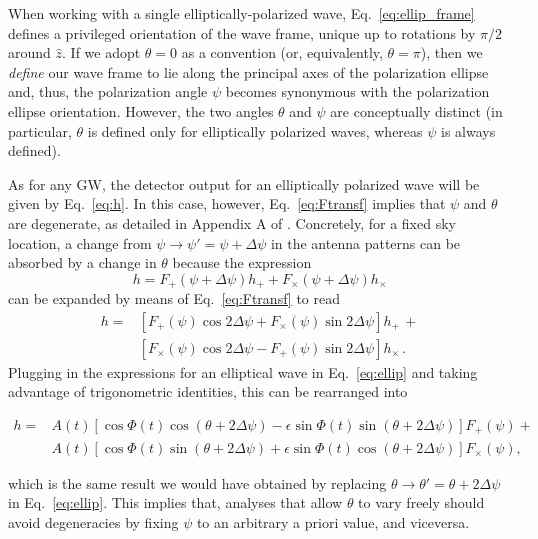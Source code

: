 \documentclass[aps,prd,twocolumn,superscriptaddress,preprintnumbers,floatfix,nofootinbib]{revtex4-2}
\newcommand{\beq}{\begin{equation}}
\newcommand{\eeq}{\end{equation}}
\newcommand*{\eq}[1]{Eq.~\eqref{eq:#1}}
\begin{document}
When working with a single elliptically-polarized wave, Eq.~\eqref{eq:ellip_frame} defines a privileged orientation of the wave frame, unique up to rotations by $\pi/2$ around $\hat{z}$.
If we adopt $\theta =0$ as a convention (or, equivalently, $\theta=\pi$), then we \emph{define} our wave frame to lie along the principal axes of the polarization ellipse and, thus, the polarization angle $\psi$ becomes synonymous with the polarization ellipse orientation.
However, the two angles $\theta$ and $\psi$ are conceptually distinct (in particular, $\theta$ is defined only for elliptically polarized waves, whereas $\psi$ is always defined).


As for any GW, the detector output for an elliptically polarized wave will be given by \eq{h}.
In this case, however, \eq{Ftransf} implies that $\psi$ and $\theta$ are degenerate, as detailed in Appendix A of \cite{Isi:2017equ}.
Concretely, for a fixed sky location, a change from $\psi \to \psi' = \psi + \Delta\psi$ in the antenna patterns can be absorbed by a change in $\theta$ because the expression
\beq
h = F_+(\psi + \Delta \psi) h_+ + F_\times(\psi + \Delta \psi) h_\times 
\eeq
can be expanded by means of \eq{Ftransf} to read
\begin{align}
h = &\left[ F_+(\psi) \cos 2\Delta\psi + F_\times(\psi) \sin 2\Delta\psi \right] h_+\, + \\
 &\left[F_\times(\psi) \cos 2\Delta\psi - F_+(\psi)\sin 2\Delta\psi\right] h_\times \, .
\end{align}
Plugging in the expressions for an elliptical wave in \eq{ellip} and taking advantage of trigonometric identities, this can be rearranged into
\begin{widetext}
\begin{align}
h = & A(t) \left[\cos \Phi(t) \cos(\theta + 2\Delta\psi) -  \epsilon \sin \Phi(t)\sin(\theta + 2\Delta\psi) \right] F_+(\psi) +\nonumber\\
&A(t) \left[\cos \Phi(t) \sin(\theta + 2\Delta\psi) + \epsilon \sin \Phi(t) \cos(\theta + 2\Delta\psi) \right] F_\times(\psi), 
\end{align}
\end{widetext}
which is the same result we would have obtained by replacing $\theta \to \theta' = \theta + 2 \Delta\psi$ in \eq{ellip}.
This implies that, analyses that allow $\theta$ to vary freely should avoid degeneracies by fixing $\psi$ to an arbitrary a priori value, and viceversa.
\end{document}
